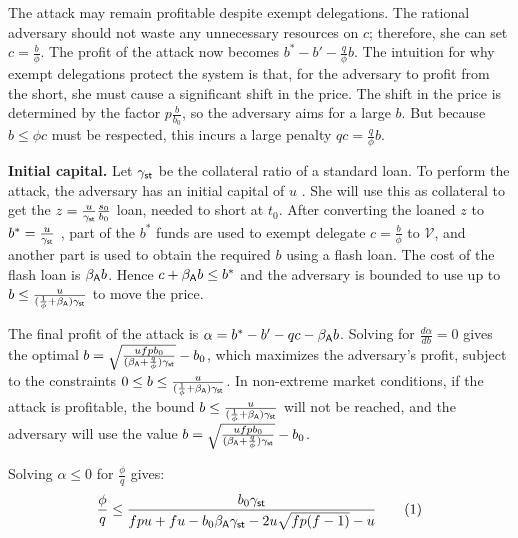 The attack may remain profitable despite exempt delegations.
The rational adversary should not waste any unnecessary resources on
$c$; therefore, she can set $c = \frac{b}{\phi}$. The profit of the attack now
becomes $b^* - b' - \frac{q}{\phi}b$.
The intuition for why exempt delegations protect the system is that,
for the adversary to profit from the short, she must cause a significant
shift in the price. The shift in the price is determined by the factor
$p\frac{b}{b_0}$, so the adversary aims for a large $b$. But because $b \leq \phi c$
must be respected, this incurs a large penalty $qc = \frac{q}{\phi}b$.

\noindent
\textbf{Initial capital.}
Let $\gamma_{\textsf{st}}$ be the collateral ratio of a standard \stasset
loan.
To perform the attack, the adversary has an initial capital of $u$ \asset.
She will use this as collateral to get the $z = \frac{u}{\gamma_{\textsf{st}}} \frac{s_0}{b_0}$ \stasset
loan, needed to short \stasset at $t_0$.
After converting the loaned $z$ \stasset to $b^*=\frac{u}{\gamma_{\textsf{st}}}$ \asset, part
of the $b^*$ funds are used to exempt delegate $c = \frac{b}{\phi}$ \asset
to $\mathcal{V}$, and another part
is used to obtain the required $b$ \asset using a flash loan. The cost of
the flash loan is $\beta_{\textsf{A}} b$. Hence $c + \beta_{\textsf{A}} b \leq b^*$
and the adversary is bounded to use up to
$b \leq \frac{u}{(\frac{1}{\phi} + \beta_{\textsf{A}})\gamma_{\textsf{st}}}$
to move the price.

The final profit of the attack is $\alpha = b^* - b' - qc - \beta_{\textsf{A}} b$.
Solving for $\frac{d\alpha}{db} = 0$ gives the optimal $b = \sqrt{\frac{u f p b_0}{(\beta_{\textsf{A}} + \frac{q}{\phi})\gamma_{\textsf{st}}}} - b_0$,
which maximizes
the adversary's profit, subject to the constraints
$0 \leq b \leq \frac{u}{(\frac{1}{\phi} + \beta_{\textsf{A}}) \gamma_{\textsf{st}}}$.
In non-extreme market conditions, if the attack is profitable, the bound
$b \leq \frac{u}{(\frac{1}{\phi} + \beta_{\textsf{A}})\gamma_{\textsf{st}}}$ will not be reached,
and the adversary will use the value
$b = \sqrt{\frac{u f p b_0}{(\beta_{\textsf{A}} + \frac{q}{\phi})\gamma_{\textsf{st}}}} - b_0$.


Solving $\alpha \leq 0$ for $\frac{\phi}{q}$ gives:
\begin{gather*}
  \frac{\phi}{q} \leq \frac{b_0 \gamma_{\textsf{st}}}{f p u + f u - b_0 \beta_{\textsf{A}} \gamma_{\textsf{st}} - 2 u \sqrt{fp (f-1)} - u} \label{eq:phi-choice} \tag{$1$}
\end{gather*}

